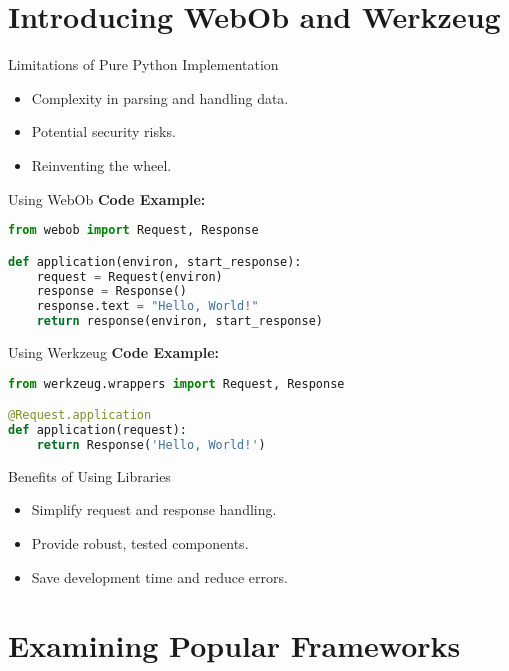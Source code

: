 \documentclass{beamer}
\begin{document}
\section{Introducing WebOb and Werkzeug}

\begin{frame}{Limitations of Pure Python Implementation}
    \begin{itemize}
        \item Complexity in parsing and handling data.
        \item Potential security risks.
        \item Reinventing the wheel.
    \end{itemize}
\end{frame}

\begin{frame}[fragile]{Using WebOb}
    \textbf{Code Example:}
    \begin{lstlisting}[language=Python]
from webob import Request, Response

def application(environ, start_response):
    request = Request(environ)
    response = Response()
    response.text = "Hello, World!"
    return response(environ, start_response)
    \end{lstlisting}
\end{frame}

\begin{frame}[fragile]{Using Werkzeug}
    \textbf{Code Example:}
    \begin{lstlisting}[language=Python]
from werkzeug.wrappers import Request, Response

@Request.application
def application(request):
    return Response('Hello, World!')
    \end{lstlisting}
\end{frame}

\begin{frame}{Benefits of Using Libraries}
    \begin{itemize}
        \item Simplify request and response handling.
        \item Provide robust, tested components.
        \item Save development time and reduce errors.
    \end{itemize}
\end{frame}

\section{Examining Popular Frameworks}
\end{document}

